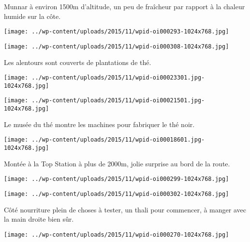  Munnar à environ 1500m d'altitude, un peu de fraîcheur par rapport à la chaleur humide sur la côte. 
\begin{center} \texttt{[image: ../wp-content/uploads/2015/11/wpid-oi000293-1024x768.jpg]} \end{center}
\begin{center} \texttt{[image: ../wp-content/uploads/2015/11/wpid-oi000308-1024x768.jpg]} \end{center}

 Les alentours sont couverts de plantations de thé. 
\begin{center} \texttt{[image: ../wp-content/uploads/2015/11/wpid-oi00023301.jpg-1024x768.jpg]} \end{center}
\begin{center} \texttt{[image: ../wp-content/uploads/2015/11/wpid-oi00021501.jpg-1024x768.jpg]} \end{center}

 Le musée du thé montre les machines pour fabriquer le thé noir. 
\begin{center} \texttt{[image: ../wp-content/uploads/2015/11/wpid-oi00018601.jpg-1024x768.jpg]} \end{center}

\pagebreak
 Montée à la Top Station à plus de 2000m, jolie surprise au bord de la route. 
\begin{center} \texttt{[image: ../wp-content/uploads/2015/11/wpid-oi000299-1024x768.jpg]} \end{center}
\begin{center} \texttt{[image: ../wp-content/uploads/2015/11/wpid-oi000302-1024x768.jpg]} \end{center}

\pagebreak
 Côté nourriture plein de choses à tester, un thali pour commencer, à manger avec la main droite bien sûr. 
\begin{center} \texttt{[image: ../wp-content/uploads/2015/11/wpid-oi000270-1024x768.jpg]} \end{center}
